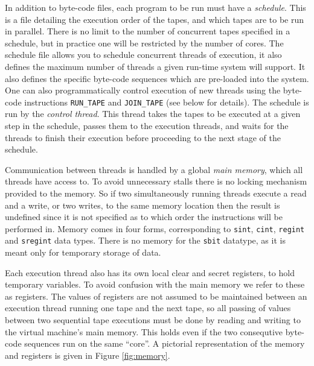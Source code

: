 In addition to byte-code files, each program to be run must
have a \emph{schedule}. This is a file detailing the execution
order of the tapes, and which tapes are to be run in parallel.
There is no limit to the number of concurrent tapes specified in a schedule, 
but in practice one will be restricted by the number of cores.
The schedule file allows you to schedule concurrent threads
of execution, it also defines the maximum number of threads
a given run-time system will support. It also defines
the specific byte-code sequences which are pre-loaded
into the system.
One can also programmatically control execution of new
threads using the byte-code instructions \verb+RUN_TAPE+ and \verb+JOIN_TAPE+
(see below for details).
The schedule is run by the \emph{control thread}.
This thread takes the tapes to be executed at a
given step in the schedule, passes them to the execution
threads, and waits for the threads to
finish their execution before proceeding to the next stage of
the schedule.

Communication between threads is handled by a global
\emph{main memory}, which all threads have access to.
To avoid unnecessary stalls there is no locking mechanism provided to
the memory. So if two simultaneously running threads
execute a read and a write, or two writes, to the same
memory location then the result is undefined since it is
not specified as to which order the instructions
will be performed in.
Memory comes in four forms, corresponding to
\verb+sint+, \verb+cint+, \verb+regint+ and \verb+sregint+
data types. There is no memory for the \verb+sbit+
datatype, as it is meant only for temporary storage of data.

Each execution thread also has its own local clear and secret
registers, to hold temporary variables.
To avoid confusion with the main memory we refer to these
as registers.
The values of registers are not assumed to be maintained
between an execution thread running one tape and
the next tape, so all passing of values
between two sequential tape executions must be done
by reading and writing to the virtual machine's main memory.
This holds even if the two consequtive byte-code
sequences run  on the same ``core''.
A pictorial representation of the memory and registers is given in 
Figure \ref{fig:memory}.



